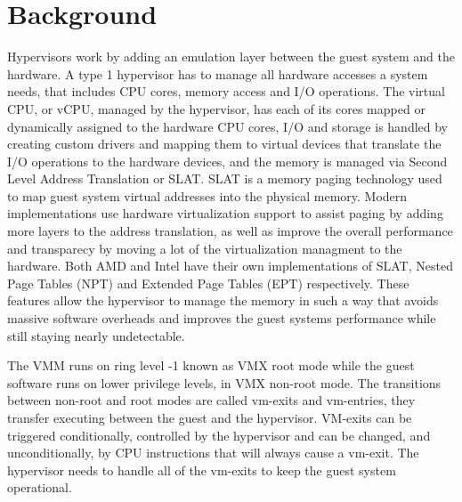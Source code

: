 \section{Background}\label{s:background}



Hypervisors work by adding an emulation layer between the guest system and the hardware. A type 1 hypervisor has to manage all hardware accesses a system needs, 
that includes CPU cores, memory access and I/O operations. The virtual CPU, or vCPU, managed by the hypervisor, has each of its cores mapped or dynamically assigned 
to the hardware CPU cores, I/O and storage is handled by creating custom drivers and mapping them to virtual devices that translate the I/O operations to the hardware 
devices, and the memory is managed via Second Level Address Translation or SLAT. SLAT is a memory paging technology used to map guest system virtual addresses 
into the physical memory. Modern implementations use hardware virtualization support to assist paging by adding more layers to the address translation, as well as 
improve the overall performance and transparecy by moving a lot of the virtualization managment to the hardware. 
Both AMD and Intel have their own implementations of SLAT, Nested Page Tables (NPT) and Extended Page Tables (EPT) respectively.
These features allow the hypervisor to manage the memory in such a way that avoids massive software overheads and improves the guest systems performance 
while still staying nearly undetectable. 

The VMM runs on ring level -1 known as VMX root mode while the guest software runs on lower privilege levels, 
in VMX non-root mode. The transitions between non-root and root modes are called vm-exits and vm-entries, they transfer executing between the guest and the hypervisor. 
VM-exits can be triggered conditionally, controlled by the hypervisor and can be changed, and unconditionally, by CPU instructions that will always cause a vm-exit. 
The hypervisor needs to handle all of the vm-exits to keep the guest system operational.


